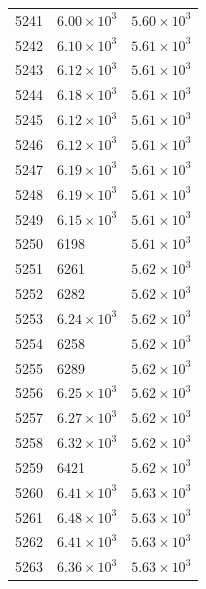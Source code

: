 \begin{table}[H]
\begin{tabular}{lll}
5241 & $\displaystyle 6.00 \times 10^{3}$ & $\displaystyle 5.60 \times 10^{3}$ \\
5242 & $\displaystyle 6.10 \times 10^{3}$ & $\displaystyle 5.61 \times 10^{3}$ \\
5243 & $\displaystyle 6.12 \times 10^{3}$ & $\displaystyle 5.61 \times 10^{3}$ \\
5244 & $\displaystyle 6.18 \times 10^{3}$ & $\displaystyle 5.61 \times 10^{3}$ \\
5245 & $\displaystyle 6.12 \times 10^{3}$ & $\displaystyle 5.61 \times 10^{3}$ \\
5246 & $\displaystyle 6.12 \times 10^{3}$ & $\displaystyle 5.61 \times 10^{3}$ \\
5247 & $\displaystyle 6.19 \times 10^{3}$ & $\displaystyle 5.61 \times 10^{3}$ \\
5248 & $\displaystyle 6.19 \times 10^{3}$ & $\displaystyle 5.61 \times 10^{3}$ \\
5249 & $\displaystyle 6.15 \times 10^{3}$ & $\displaystyle 5.61 \times 10^{3}$ \\
5250 & 6198 & $\displaystyle 5.61 \times 10^{3}$ \\
5251 & 6261 & $\displaystyle 5.62 \times 10^{3}$ \\
5252 & 6282 & $\displaystyle 5.62 \times 10^{3}$ \\
5253 & $\displaystyle 6.24 \times 10^{3}$ & $\displaystyle 5.62 \times 10^{3}$ \\
5254 & 6258 & $\displaystyle 5.62 \times 10^{3}$ \\
5255 & 6289 & $\displaystyle 5.62 \times 10^{3}$ \\
5256 & $\displaystyle 6.25 \times 10^{3}$ & $\displaystyle 5.62 \times 10^{3}$ \\
5257 & $\displaystyle 6.27 \times 10^{3}$ & $\displaystyle 5.62 \times 10^{3}$ \\
5258 & $\displaystyle 6.32 \times 10^{3}$ & $\displaystyle 5.62 \times 10^{3}$ \\
5259 & 6421 & $\displaystyle 5.62 \times 10^{3}$ \\
5260 & $\displaystyle 6.41 \times 10^{3}$ & $\displaystyle 5.63 \times 10^{3}$ \\
5261 & $\displaystyle 6.48 \times 10^{3}$ & $\displaystyle 5.63 \times 10^{3}$ \\
5262 & $\displaystyle 6.41 \times 10^{3}$ & $\displaystyle 5.63 \times 10^{3}$ \\
5263 & $\displaystyle 6.36 \times 10^{3}$ & $\displaystyle 5.63 \times 10^{3}$ \\

\end{tabular}
\end{table}
